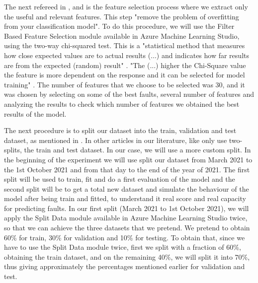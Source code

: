 The next refereed in \cite{ML_Data_processing}, \cite{N_4_WIND} and \cite{39_WIND} is the feature selection process where we extract only the useful and relevant features. This step "remove the problem of overfitting from your classification model". To do this procedure, we will use the Filter Based Feature Selection module available in Azure Machine Learning Studio, using the two-way chi-squared test. This is a "statistical method that measures how close expected values are to actual results (...) and indicates how far results are from the expected (random) result" \cite{AZURE_MACHINE_LEARNING}. "The (...) higher the Chi-Square value the feature is more dependent on the response and it can be selected for model training" \cite{TDC_ChiSquared}. The number of features that we choose to be selected was 30, and it was chosen by selecting on some of the best faults, several number of features and analyzing the results to check which number of features we obtained the best results of the model.

The next procedure is to split our dataset into the train, validation and test dataset, as mentioned in \cite{TDC_Train_Test_Split} \cite{TDC_TrainValidationTest}. In other articles in our literature, like \cite{Machine_Learning_Mistery_Train-Test-Split} \cite{ML_Data_processing} \cite{N_4_WIND} \cite{41_WIND} only use two-splits, the train and test dataset.
In our case, we will use a more custom split. In the beginning of the experiment we will use split our dataset from March 2021 to the 1st October 2021 and from that day to the end of the year of 2021. The first split will be used to train, fit and do a first evaluation of the model and the second split will be to get a total new dataset and simulate the behaviour of the model after being train and fitted, to understand it real score and real capacity for predicting faults.
In our first split (March 2021 to 1st October 2021), we will apply the Split Data module available in Azure Machine Learning Studio twice, so that we can achieve the three datasets that we pretend. We pretend to obtain 60\% for train, 30\% for validation and 10\% for testing. To obtain that, since we have to use the Split Data module twice, first we split with a fraction of 60\%, obtaining the train dataset, and on the remaining 40\%, we will split it into 70\%, thus giving approximately the percentages mentioned earlier for validation and test.

